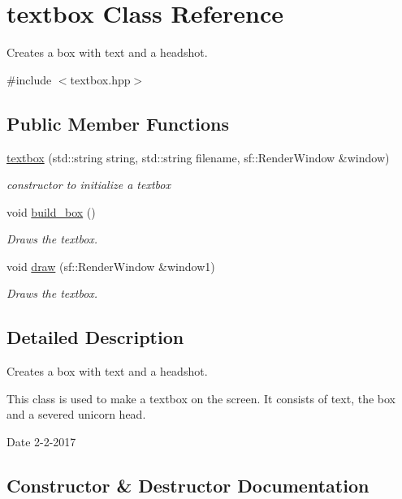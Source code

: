 \hypertarget{classtextbox}{}\section{textbox Class Reference}
\label{classtextbox}


Creates a box with text and a headshot.  




{\ttfamily \#include $<$textbox.\+hpp$>$}

\subsection*{Public Member Functions}
\begin{DoxyCompactItemize}
\item 
\hyperlink{classtextbox_afdd34f992de52674f7c9625ec6f765bf}{textbox} (std\+::string string, std\+::string filename, sf\+::\+Render\+Window \&window)
\begin{DoxyCompactList}\small\item\em constructor to initialize a textbox \end{DoxyCompactList}\item 
void \hyperlink{classtextbox_a1ef9daaf81a560bd571bc82ec09cbfda}{build\+\_\+box} ()
\begin{DoxyCompactList}\small\item\em Draws the textbox. \end{DoxyCompactList}\item 
void \hyperlink{classtextbox_a7fa168e1b9aedae0d7c9a74adea2137a}{draw} (sf\+::\+Render\+Window \&window1)
\begin{DoxyCompactList}\small\item\em Draws the textbox. \end{DoxyCompactList}\end{DoxyCompactItemize}


\subsection{Detailed Description}
Creates a box with text and a headshot. 

This class is used to make a textbox on the screen. It consists of text, the box and a severed unicorn head.

\begin{DoxyDate}{Date}
2-\/2-\/2017 
\end{DoxyDate}


\subsection{Constructor \& Destructor Documentation}
\mbox{\label{classtextbox_afdd34f992de52674f7c9625ec6f765bf}} 
